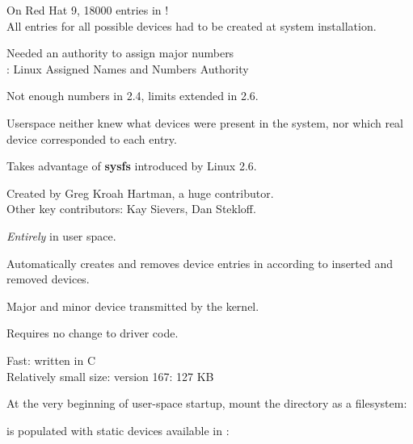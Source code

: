
  \startitemize
  \item On Red Hat 9, 18000 entries in !\\
    All entries for all possible devices had to be created at system
    installation.
  \item Needed an authority to assign major numbers\\
    : Linux Assigned Names and Numbers
    Authority
  \item Not enough numbers in 2.4, limits extended in 2.6.
  \item Userspace neither knew what devices were present in the
    system, nor which real device corresponded to each 
    entry.
  \stopitemize

  Takes advantage of {\bf sysfs} introduced by Linux 2.6.
  \startitemize
  \item Created by Greg Kroah Hartman, a huge contributor.\\
    Other key contributors: Kay Sievers, Dan Stekloff.
  \item {\em Entirely} in user space.
  \item Automatically creates and removes device entries in
     according to inserted and removed devices.
  \item Major and minor device transmitted by the kernel.
  \item Requires no change to driver code.
  \item Fast: written in C\\
    Relatively small size:  version 167: 127 KB
  \stopitemize

  \startitemize
  \item At the very beginning of user-space startup,
    mount the  directory as a  filesystem:\\
  \item {} is populated with static devices available in
    :
  \stopitemize

